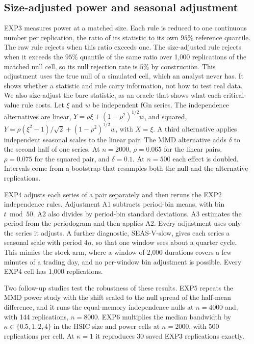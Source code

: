 \documentclass[11pt]{article}
\theoremstyle{remark}
\begin{document}
\subsection{Size-adjusted power and seasonal adjustment}\label{sec:exp34-design}
EXP3 measures power at a matched size. Each rule is reduced to one continuous number per replication, the ratio of its statistic to its own $95\%$ reference quantile. The raw rule rejects when this ratio exceeds one. The size-adjusted rule rejects when it exceeds the $95\%$ quantile of the same ratio over 1,000 replications of the matched null cell, so its null rejection rate is $5\%$ by construction. This adjustment uses the true null of a simulated cell, which an analyst never has. It shows whether a statistic and rule carry information, not how to test real data. We also size-adjust the bare statistic, as an oracle that shows what each critical-value rule costs. Let $\xi$ and $w$ be independent fGn series. The independence alternatives are linear, $Y=\rho\xi+(1-\rho^2)^{1/2}w$, and squared, $Y=\rho(\xi^2-1)/\sqrt2+(1-\rho^2)^{1/2}w$, with $X=\xi$. A third alternative applies independent seasonal scales to the linear pair. The MMD alternative adds $\delta$ to the second half of one series. At $n=2000$, $\rho=0.065$ for the linear pairs, $\rho=0.075$ for the squared pair, and $\delta=0.1$. At $n=500$ each effect is doubled. Intervals come from a bootstrap that resamples both the null and the alternative replications.

EXP4 adjusts each series of a pair separately and then reruns the EXP2 independence rules. Adjustment A1 subtracts period-bin means, with bin $t \bmod 50$. A2 also divides by period-bin standard deviations. A3 estimates the period from the periodogram and then applies A2. Every adjustment uses only the series it adjusts. A further diagnostic, SEAS-V-slow, gives each series a seasonal scale with period $4n$, so that one window sees about a quarter cycle. This mimics the stock arm, where a window of 2,000 durations covers a few minutes of a trading day, and no per-window bin adjustment is possible. Every EXP4 cell has 1,000 replications.

Two follow-up studies test the robustness of these results. EXP5 repeats the MMD power study with the shift scaled to the null spread of the half-mean difference, and it runs the equal-memory independence nulls at $n=4000$ and, with 144 replications, $n=8000$. EXP6 multiplies the median bandwidth by $\kappa\in\{0.5,1,2,4\}$ in the HSIC size and power cells at $n=2000$, with 500 replications per cell. At $\kappa=1$ it reproduces 30 saved EXP3 replications exactly.
\end{document}
